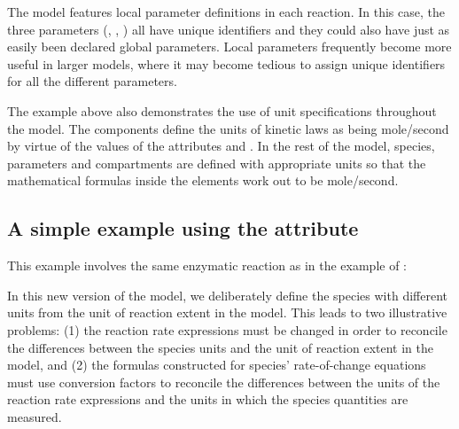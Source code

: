 
The model features local parameter definitions in each reaction.
In this case, the three parameters (, ,
) all have unique identifiers and they could also have
just as easily been declared global parameters.  Local parameters
frequently become more useful in larger models, where it may
become tedious to assign unique identifiers for all the different
parameters.

The example above also demonstrates the use of unit specifications
throughout the model.  The  components define the
units of kinetic laws as being \unit{mole}/\unit{second} by virtue
of the values of the attributes  and
.  In the rest of the model, species, parameters
and compartments are defined with appropriate units so that the
mathematical formulas inside the  elements work
out to be \unit{mole}/\unit{second}.


\subsection{A simple example using the  attribute}
\label{sec:eg:conversionfactor}

This example involves the same enzymatic reaction as in the
example of :
\begin{center}
\end{center}
In this new version of the model, we deliberately define the
species with different units from the unit of reaction extent in
the model.  This leads to two illustrative problems: (1) the
reaction rate expressions must be changed in order to reconcile
the differences between the species units and the unit of reaction
extent in the model, and (2) the formulas constructed for species'
rate-of-change equations must use conversion factors to reconcile
the differences between the units of the reaction rate expressions
and the units in which the species quantities are measured.

